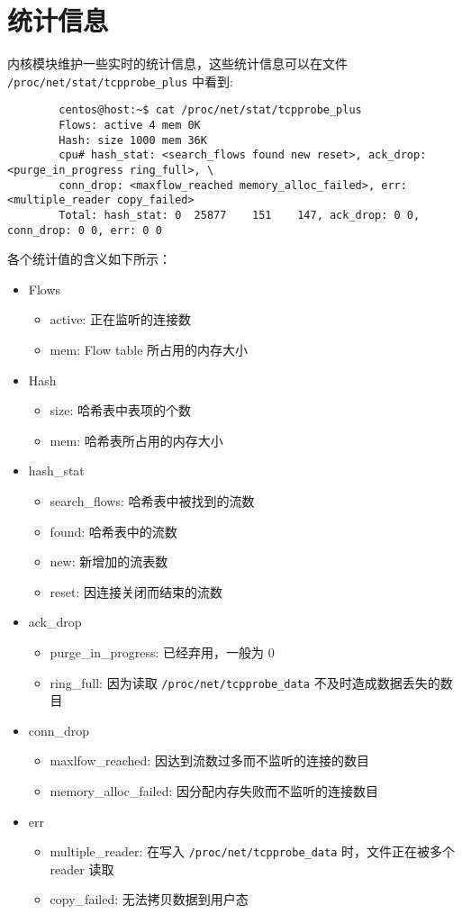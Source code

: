 \documentclass{article}
\begin{document}
	\section{统计信息}
	\par 内核模块维护一些实时的统计信息，这些统计信息可以在文件 \texttt{/proc/net/stat/tcpprobe\_plus} 中看到:
	\begin{verbatim}
		centos@host:~$ cat /proc/net/stat/tcpprobe_plus
		Flows: active 4 mem 0K
		Hash: size 1000 mem 36K
		cpu# hash_stat: <search_flows found new reset>, ack_drop: <purge_in_progress ring_full>, \ 
		conn_drop: <maxflow_reached memory_alloc_failed>, err: <multiple_reader copy_failed>
		Total: hash_stat: 0  25877    151    147, ack_drop: 0 0, conn_drop: 0 0, err: 0 0
	\end{verbatim}
	\par 各个统计值的含义如下所示：
	\begin{itemize}
		\item Flows
		\begin{itemize}
			\item active: 正在监听的连接数
			\item mem: Flow table 所占用的内存大小
		\end{itemize}
		\item Hash
		\begin{itemize}
			\item size: 哈希表中表项的个数
			\item mem: 哈希表所占用的内存大小
		\end{itemize}
		\item hash\_stat
		\begin{itemize}
			\item search\_flows: 哈希表中被找到的流数
			\item found: 哈希表中的流数
			\item new: 新增加的流表数
			\item reset: 因连接关闭而结束的流数
		\end{itemize}
		\item ack\_drop
		\begin{itemize}
			\item purge\_in\_progress: 已经弃用，一般为 0
			\item ring\_full: 因为读取 \texttt{/proc/net/tcpprobe\_data} 不及时造成数据丢失的数目
		\end{itemize}
		\item conn\_drop
		\begin{itemize}
			\item maxlfow\_reached: 因达到流数过多而不监听的连接的数目
			\item memory\_alloc\_failed: 因分配内存失败而不监听的连接数目
		\end{itemize}
		\item err
		\begin{itemize}
			\item multiple\_reader: 在写入 \texttt{/proc/net/tcpprobe\_data} 时，文件正在被多个 reader 读取
			\item copy\_failed: 无法拷贝数据到用户态
		\end{itemize}
	\end{itemize}
\end{document}
